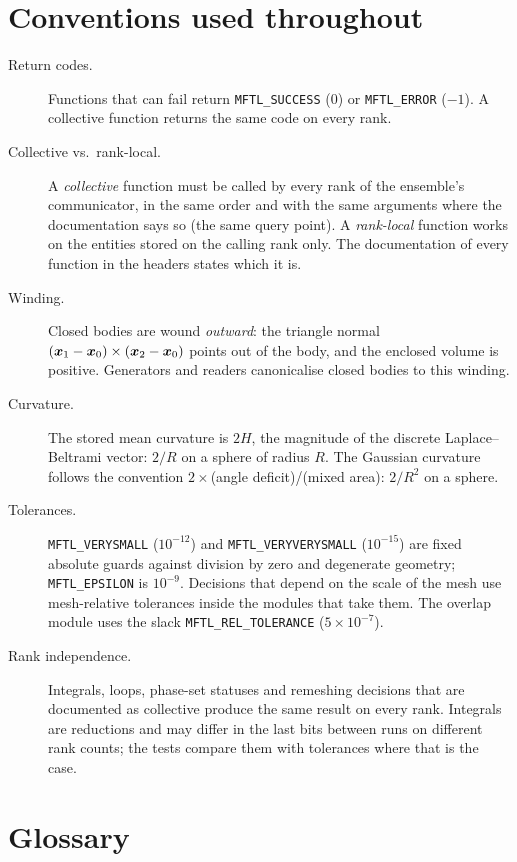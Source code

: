 \section{Conventions used throughout}
\label{sec:conventions}

\begin{description}
\item[Return codes.] Functions that can fail return \texttt{MFTL\_SUCCESS} (0) or
  \texttt{MFTL\_ERROR} ($-1$). A collective function returns the same code on every rank.
\item[Collective vs.\ rank-local.] A \emph{collective} function must be called by every rank of
  the ensemble's communicator, in the same order and with the same arguments where the
  documentation says so (\eg the same query point). A \emph{rank-local} function works on the
  entities stored on the calling rank only. The documentation of every function in the headers
  states which it is.
\item[Winding.] Closed bodies are wound \emph{outward}: the triangle normal
  $(\boldsymbol{x}_1-\boldsymbol{x}_0)\times(\boldsymbol{x}_2-\boldsymbol{x}_0)$ points out of the body, and the
  enclosed volume is positive. Generators and readers canonicalise closed bodies to this
  winding.
\item[Curvature.] The stored mean curvature is $2H$, the magnitude of the discrete
  Laplace--Beltrami vector: $2/R$ on a sphere of radius $R$. The Gaussian curvature follows the
  \mftlone{} convention $2\times$(angle deficit)/(mixed area): $2/R^2$ on a sphere.
\item[Tolerances.] \texttt{MFTL\_VERYSMALL} ($10^{-12}$) and \texttt{MFTL\_VERYVERYSMALL}
  ($10^{-15}$) are fixed absolute guards against division by zero and degenerate geometry;
  \texttt{MFTL\_EPSILON} is $10^{-9}$. Decisions that depend on the scale of the mesh use
  mesh-relative tolerances inside the modules that take them. The overlap module uses the
  \mftlone{} slack \texttt{MFTL\_REL\_TOLERANCE} ($5\times10^{-7}$).
\item[Rank independence.] Integrals, loops, phase-set statuses and remeshing decisions that are
  documented as collective produce the same result on every rank. Integrals are reductions and
  may differ in the last bits between runs on different rank counts; the tests compare them with
  tolerances where that is the case.
\end{description}

\section{Glossary}
\label{sec:glossary}

